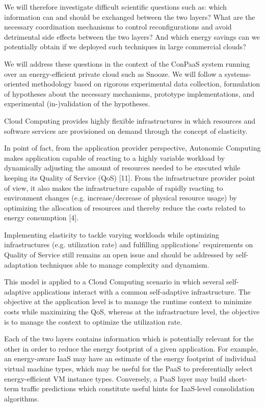 We will therefore investigate difficult scientific questions such as: which information can and should be exchanged between the two layers? What are the necessary coordination mechanisms to control reconfigurations and avoid detrimental side effects between the two layers? And which energy savings can we potentially obtain if we deployed such techniques in large commercial clouds?

We will address these questions in the context of the ConPaaS system running over an energy-efficient private cloud such as Snooze. We will follow a systems-oriented methodology based on rigorous experimental data collection, formulation of hypotheses about the necessary mechanisms, prototype implementations, and experimental (in-)validation of the hypotheses.

Cloud Computing provides highly flexible infrastructures in which resources and software services are provisioned on demand through the concept of elasticity.

In point of fact, from the application provider perspective, Autonomic Computing makes application capable of reacting to a highly variable workload by dynamically adjusting the amount of resources needed to be executed while keeping its Quality of Service (QoS) [11]. From the infrastructure provider point of view, it also makes the infrastructure capable of rapidly reacting to environment changes (e.g. increase/decrease of physical resource usage) by optimizing the allocation of resources and thereby reduce the costs related to energy consumption [4].

Implementing elasticity to tackle varying workloads while optimizing infrastructures (e.g. utilization rate) and fulfilling applications’ requirements on Quality of Service still remains an open issue and should be addressed by self-adaptation techniques able to manage complexity and dynamism. 

This model is applied to a Cloud Computing scenario in which several self-adaptive applications interact with a common self-adaptive infrastructure. The objective at the application level is to manage the runtime context to minimize costs while maximizing the QoS, whereas at the infrastructure level, the objective is to manage the context to optimize the utilization rate. 

Each of the two layers contains information which is potentially relevant for the other in order to reduce the energy footprint of a given application. For example, an energy-aware IaaS may have an estimate of the energy footprint of individual virtual machine types, which may be useful for the PaaS to preferentially select energy-efficient VM instance types. Conversely, a PaaS layer may build short-term traffic predictions which constitute useful hints for IaaS-level consolidation algorithms.

